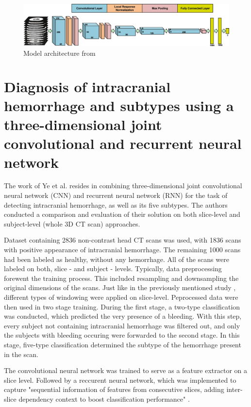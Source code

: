 \begin{figure}[h]
\begin{centering}
\includegraphics[width=16cm]{assets/images/RW1-net-arch.png}
\par\end{centering}
\caption{Model architecture from \cite{relatedWork1} \label{fig:rw1}}
\end{figure}


\section{Diagnosis of intracranial hemorrhage and subtypes using a three-dimensional joint convolutional and recurrent neural network}

The work of Ye et al. \cite{relatedWork2} resides in combining three-dimensional joint convolutional neural network (CNN) and recurrent neural network (RNN) for the task of detecting intracranial hemorrhage, as well as its five subtypes. The authors conducted a comparison and evaluation of their solution on both slice-level and subject-level (whole 3D CT scan) approaches.

Dataset containing 2836 non-contrast head CT scans was used, with 1836 scans with positive appearance of intracranial hemorrhage. The remaining 1000 scans had been labeled as healthy, without any hemorrhage. All of the scans were labeled on both, slice - and subject - levels. Typically, data preprocessing forewent the training process. This included resampling and downsampling the original dimensions of the scans. Just like in the previously mentioned study \cite{relatedWork1}, different types of windowing were applied on slice-level. Peprocessed data were then used in two stage training. During the first stage, a two-type classification was conducted, which predicted the very presence of a bleeding. With this step, every subject not containing intracranial hemorrhage was filtered out, and only the subjects with bleeding occuring were forwarded to the second stage. In this stage, five-type classification determined the subtype of the hemorrhage present in the scan.

The convolutional neural network was trained to serve as a feature extractor on a slice level. Followed by a reccurent neural network, which was implemented to capture "sequential information of features from consecutive slices, adding inter-slice dependency context to boost classification performance" \cite{relatedWork2}.
